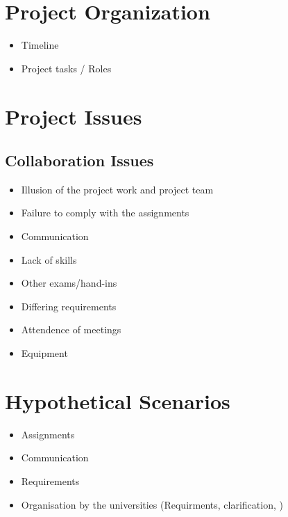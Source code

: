 
\section{Project Organization}

	\begin{itemize}
		\item Timeline
		\item Project tasks / Roles
	\end{itemize}


\section{Project Issues}

\subsection{Collaboration Issues}

	\begin{itemize}

		\item Illusion of the project work and project team
		\item Failure to comply with the assignments
		\item Communication
		\item Lack of skills
		\item Other exams/hand-ins
		\item Differing requirements
		\item Attendence of meetings
		\item Equipment

	\end{itemize}


\section{Hypothetical Scenarios}

	\begin{itemize}
		\item Assignments
		\item Communication
		\item Requirements
		\item Organisation by the universities (Requirments, clarification, )
	\end{itemize}
